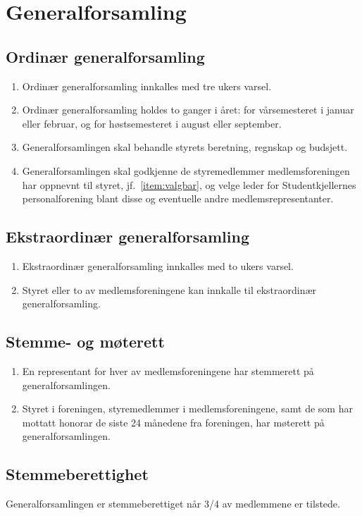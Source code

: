 \documentclass[11pt,norsk,a4paper]{article}
\begin{document}
\section{Generalforsamling}

\subsection{Ordinær generalforsamling}
\begin{enumerate}
	\item Ordinær generalforsamling innkalles med tre ukers varsel. 
	\item Ordinær generalforsamling holdes to ganger i året: for vårsemesteret i januar eller februar, og for høstsemesteret i august eller september.
	\item Generalforsamlingen skal behandle styrets beretning, regnskap og budsjett. 
	\item Generalforsamlingen skal godkjenne de styremedlemmer medlemsforeningen 
		har oppnevnt til styret, jf.~\ref{item:valgbar}, 
		og velge leder for Studentkjellernes personalforening blant disse og eventuelle andre medlemsrepresentanter.
\end{enumerate}

\subsection{Ekstraordinær generalforsamling}
\begin{enumerate}
	\item Ekstraordinær generalforsamling innkalles med to ukers varsel. 
	\item Styret eller to av medlemsforeningene kan innkalle til ekstraordinær generalforsamling.
\end{enumerate}

\subsection{Stemme- og møterett}
\begin{enumerate}
	\item En representant for hver av medlemsforeningene har stemmerett på generalforsamlingen.
	\item Styret i foreningen, styremedlemmer i medlemsforeningene,
samt de som har mottatt honorar de siste 24 månedene fra foreningen, har møterett på
generalforsamlingen.
\end{enumerate}

\subsection{Stemmeberettighet}
Generalforsamlingen er stemmeberettiget når 3/4 av medlemmene er tilstede.
\end{document}
